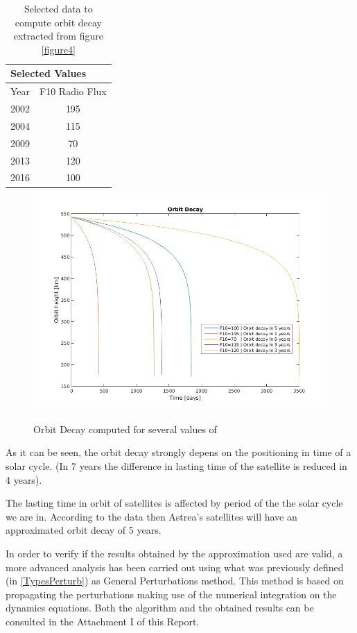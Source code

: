 \begin{table}[]
\centering
\caption{Selected data to compute orbit decay extracted from figure \ref{figure4}}
\label{OrbDecCompT}
\begin{tabular}{|l|c|}
\hline
\multicolumn{2}{|l|}{Selected Values}      \\ \hline
Year & \multicolumn{1}{l|}{F10 Radio Flux} \\ \hline
2002 & 195                                 \\ \hline
2004 & 115                                 \\ \hline
2009 & 70                                  \\ \hline
2013 & 120                                 \\ \hline
2016 & 100                                 \\ \hline
\end{tabular}
\end{table}  
\begin{figure}[H] %
	\centering
	\includegraphics[width=.8\textwidth]{OrbitDecayComp.png}\\
	\caption{Orbit Decay computed for several values of }
	\label{fig:OrbitDecayComp} 
\end{figure}

As it can be seen, the orbit decay strongly depens on the positioning in time of a solar cycle. (In 7 years the difference in lasting time of the satellite is reduced in 4 years).

The lasting time in orbit of satellites is affected by period of the the solar cycle we are in. According to the data then Astrea's satellites will have an approximated orbit decay of 5 years.

In order to verify if the results obtained by the approximation used are valid, a more advanced analysis has been carried out using what was previously defined (in \ref{TypesPerturb}) as General Perturbations method. This method is based on propagating the perturbations making use of the numerical integration on the dynamics equations. Both the algorithm and the obtained results can be consulted in the Attachment I of this Report.